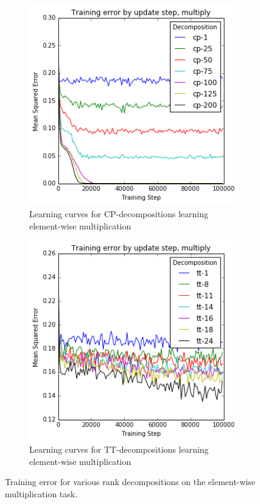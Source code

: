 \begin{figure}
	\begin{subfigure}[t]{0.45\textwidth}
		\includegraphics[width=\textwidth]{tensors/multiply-cp-mom}
		\caption{Learning curves for CP-decompositions learning element-wise multiplication}
	\end{subfigure}
	\hfill
	\begin{subfigure}[t]{0.45\textwidth}
		\includegraphics[width=\textwidth]{tensors/multiply-tt-mom}
		\caption{Learning curves for TT-decompositions learning element-wise multiplication}
	\end{subfigure}
	\caption{Training error for various rank decompositions on the element-wise multiplication
	task.}
	\label{fig:multiply-ff}
\end{figure}

